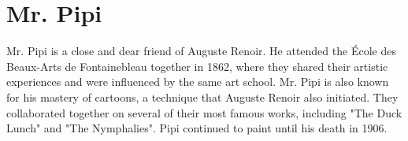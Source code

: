\documentclass[12pt, a4paper]{article}
\begin{document}
\section*{Mr. Pipi}
\noindent
Mr. Pipi is a close and dear friend of Auguste Renoir. He attended the École des Beaux-Arts de Fontainebleau together in 1862, where they shared their artistic experiences and were influenced by the same art school. Mr. Pipi is also known for his mastery of cartoons, a technique that Auguste Renoir also initiated. They collaborated together on several of their most famous works, including "The Duck Lunch" and "The Nymphalies". Pipi continued to paint until his death in 1906.
\end{document}
